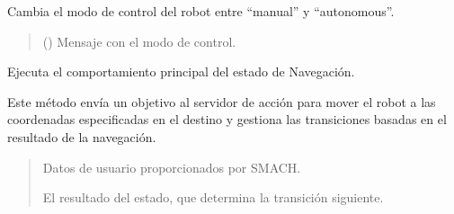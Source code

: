 \documentclass[a4paper,10pt,spanish]{sphinxmanual}
\begin{document}
\begin{fulllineitems}
\begin{fulllineitems}
\sphinxAtStartPar
Cambia el modo de control del robot entre “manual” y “autonomous”.
\begin{quote}\begin{description}
\sphinxAtStartPar
{} () \textendash{} Mensaje con el modo de control.

\end{description}\end{quote}

\end{fulllineitems}


\begin{fulllineitems}
\label{\detokenize{squad_state_manager:squad_state_manager.EstadoNavegacion.execute}}
\pysigstartsignatures
{}
\pysigstopsignatures
\sphinxAtStartPar
Ejecuta el comportamiento principal del estado de Navegación.

\sphinxAtStartPar
Este método envía un objetivo al servidor de acción  para mover el robot
a las coordenadas especificadas en el destino y gestiona las transiciones basadas
en el resultado de la navegación.
\begin{quote}\begin{description}
\sphinxAtStartPar
{} \textendash{} Datos de usuario proporcionados por SMACH.

\sphinxAtStartPar
El resultado del estado, que determina la transición siguiente.

\sphinxAtStartPar
{}

\end{description}\end{quote}

\end{fulllineitems}



\end{fulllineitems}
\end{document}

